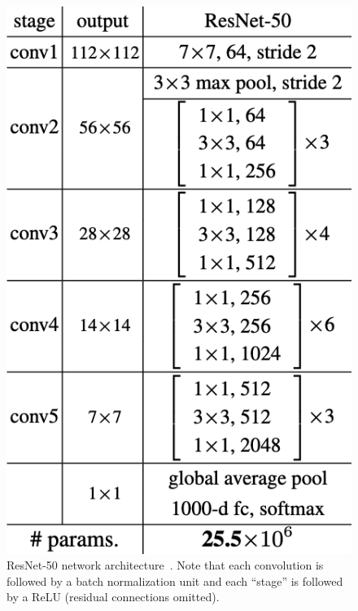 \begin{figure}
    \includegraphics[width=.6\linewidth]{figures/resnet50.png}
    \caption{ResNet-50 network architecture~\cite{he2015deep}. Note that each convolution is followed by a batch normalization unit and each ``stage'' is followed by a ReLU (residual connections omitted).}
    \label{fig:resnet}
\end{figure}
